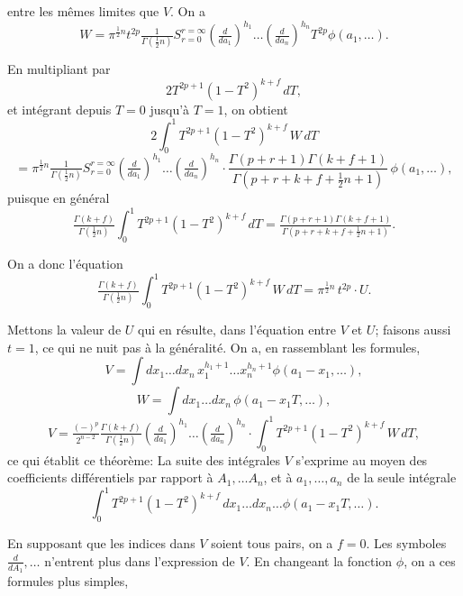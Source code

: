\documentclass[11pt]{article}
\begin{document}
\newpage
\setcounter{page}{205}

entre les m\^emes limites que $V$. On a
\[
W = \pi^{\tfrac12 n} t^{2p} \tfrac{1}{\Gamma(\tfrac12 n)} S^{r=\infty}_{r=0} \!\left( \tfrac{d}{da_1}\right)^{\!h_1} \!\!\ldots \left( \tfrac{d}{da_n}\right)^{\!h_n} T^{2p}\phi(a_1, \ldots).
\]

En multipliant par
\[
2T^{2p+1}(1-T^2)^{k+f}\,dT,
\]
et int\'egrant depuis $T = 0$ jusqu'\`a $T = 1$, on obtient
\[
2 \int_0^1 T^{2p+1}(1-T^2)^{k+f}\,W\,dT
\]
\[
= \pi^{\tfrac12 n} \tfrac{1}{\Gamma(\tfrac12 n)} S^{r=\infty}_{r=0} \!\left(\tfrac{d}{da_1}\right)^{\!h_1}\!\!\ldots\!\left(\tfrac{d}{da_n}\right)^{\!h_n}\!\!\cdot \frac{\Gamma(p+r+1)\Gamma(k+f+1)}{\Gamma(p+r+k+f+\tfrac12 n+1)}\,\phi(a_1, \ldots),
\]
puisque en g\'en\'eral
\[
\tfrac{\Gamma(k+f)}{\Gamma(\tfrac12 n)} \int_0^1 T^{2p+1}(1-T^2)^{k+f}\,dT = \tfrac{\Gamma(p+r+1)\Gamma(k+f+1)}{\Gamma(p+r+k+f+\tfrac12 n+1)}.
\]

On a donc l'\'equation
\[
\tfrac{\Gamma(k+f)}{\Gamma(\tfrac12 n)} \int_0^1 T^{2p+1}(1-T^2)^{k+f}\,W\,dT = \pi^{\tfrac12 n}\, t^{2p}\cdot U.
\]

Mettons la valeur de $U$ qui en r\'esulte, dans l'\'equation entre $V$ et $U$; faisons aussi $t = 1$, ce qui ne nuit pas \`a la g\'en\'eralit\'e. On a, en rassemblant les formules,
\[
V = \int dx_1 \ldots dx_n\, x_1^{h_1+1} \ldots x_n^{h_n+1} \phi(a_1 - x_1, \ldots),
\]
\[
W = \int dx_1 \ldots dx_n\, \phi(a_1 - x_1 T, \ldots),
\]
\[
V = \tfrac{(-)^p}{2^{n-2}} \tfrac{\Gamma(k+f)}{\Gamma(\tfrac12 n)}\!\left(\tfrac{d}{da_1}\right)^{\!h_1}\!\!\ldots\!\left(\tfrac{d}{da_n}\right)^{\!h_n}\!\!\cdot\!\int_0^1 T^{2p+1}(1-T^2)^{k+f}\,W\,dT,
\]
ce qui \'etablit ce th\'eor\`eme: La suite des int\'egrales $V$ s'exprime au moyen des coefficients diff\'erentiels par rapport \`a $A_1, \ldots A_n$, et \`a $a_1, \ldots, a_n$ de la seule int\'egrale
\[
\int_0^1 T^{2p+1}(1-T^2)^{k+f}\,dx_1 \ldots dx_n \ldots \phi(a_1 - x_1 T, \ldots).
\]

En supposant que les indices dans $V$ soient tous pairs, on a $f = 0$. Les symboles $\tfrac{d}{dA_1}, \ldots$ n'entrent plus dans l'expression de $V$. En changeant la fonction $\phi$, on a ces formules plus simples,

\newpage
\setcounter{page}{206}
\end{document}
